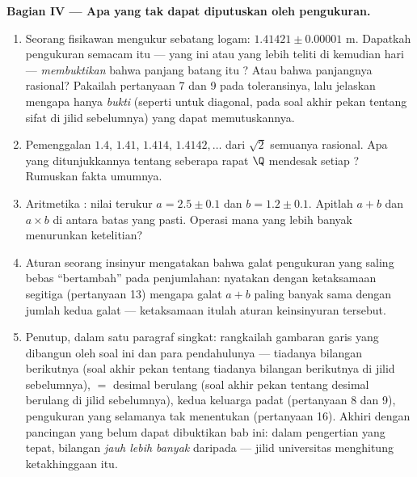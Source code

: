 \begin{problem}
\medskip
\noindent\textbf{Bagian IV --- Apa yang tak dapat diputuskan oleh pengukuran.}
\begin{enumerate}[resume]
  \item Seorang fisikawan mengukur sebatang logam: $1.41421 \pm 0.00001$ m.
        Dapatkah pengukuran semacam itu --- yang ini atau yang lebih teliti
        di kemudian hari --- \emph{membuktikan} bahwa panjang batang itu
        ? Atau bahwa panjangnya rasional? Pakailah pertanyaan 7
        dan 9 pada  toleransinya, lalu jelaskan mengapa hanya
        \emph{bukti} (seperti untuk diagonal, pada soal akhir pekan tentang
        sifat  di jilid sebelumnya) yang dapat memutuskannya.
  \item Pemenggalan $1.4$, $1.41$, $1.414$, $1.4142,\dots$
        dari $\sqrt2$ semuanya rasional. Apa yang ditunjukkannya tentang
        seberapa rapat $\Q$ mendesak setiap ?
        Rumuskan fakta umumnya.
  \item Aritmetika : nilai terukur $a = 2.5 \pm 0.1$
        dan $b = 1.2 \pm 0.1$. Apitlah $a + b$ dan $a \times b$
        di antara batas yang pasti. Operasi mana yang lebih banyak
        menurunkan ketelitian?
  \item Aturan seorang insinyur mengatakan bahwa galat pengukuran yang
        saling bebas ``bertambah'' pada penjumlahan: nyatakan dengan
        ketaksamaan segitiga (pertanyaan 13) mengapa galat $a + b$ paling
        banyak sama dengan jumlah kedua galat --- ketaksamaan itulah aturan
        keinsinyuran tersebut.
  \item Penutup, dalam satu paragraf singkat: rangkailah gambaran garis
         yang dibangun oleh soal ini dan para pendahulunya ---
        tiadanya bilangan berikutnya (soal akhir pekan tentang tiadanya
        bilangan berikutnya di jilid sebelumnya),  $=$
        desimal berulang (soal akhir pekan tentang desimal berulang di jilid
        sebelumnya), kedua keluarga padat (pertanyaan 8 dan 9), pengukuran
        yang selamanya tak menentukan (pertanyaan 16). Akhiri dengan
        pancingan yang belum dapat dibuktikan bab ini: dalam pengertian yang
        tepat, bilangan \emph{ jauh lebih banyak} daripada  --- jilid universitas menghitung ketakhinggaan itu.

\end{enumerate}
\end{problem}
